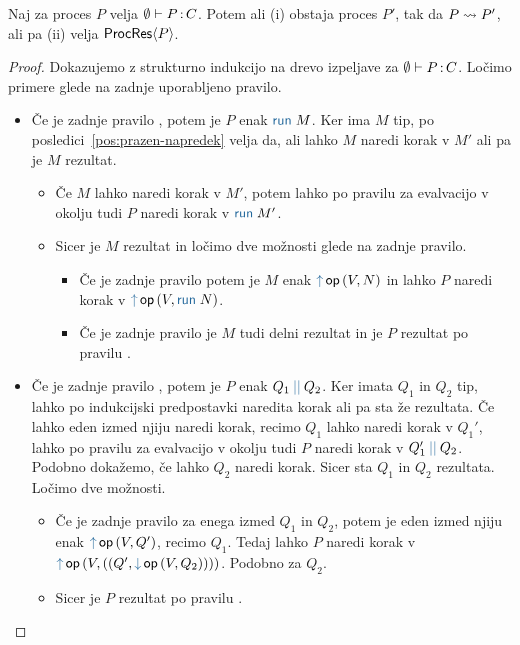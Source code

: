 \begin{izrek}[o napredku]\label{izr:napredek}
	Naj za proces $P$ velja $\emptyset \vdash P \mathinner{:} C$. Potem ali (i) obstaja proces $P'$, tak da $P \leadsto P'$, ali pa (ii) velja $\mathsf{ProcRes}\langle P \rangle$.
\end{izrek}

\begin{proof}
	Dokazujemo z strukturno indukcijo na drevo izpeljave za $\emptyset \vdash P \mathinner{:} C$.
	Ločimo primere glede na zadnje uporabljeno pravilo.
	
	\begin{itemize}
		\item Če je zadnje pravilo , potem je $P$ enak $\tmrun{M}$.
		Ker ima $M$ tip, po posledici~\ref{pos:prazen-napredek} velja da, ali lahko $M$ naredi korak v $M'$ ali pa je $M$ rezultat.
		\begin{itemize}
			\item Če $M$ lahko naredi korak v $M'$, potem lahko po pravilu za evalvacijo v okolju tudi $P$ naredi korak v $\tmrun{M'}$.
			\item Sicer je $M$ rezultat in ločimo dve možnosti glede na zadnje pravilo.
			\begin{itemize}
				\item Če je zadnje pravilo  potem je $M$ enak $\tmopout{op}{V}{N}$ in lahko $P$ naredi korak v $\tmopout{op}{V}{\tmrun{N}}$.
				\item Če je zadnje pravilo  je $M$ tudi delni rezultat in je $P$ rezultat po pravilu .
			\end{itemize}
		\end{itemize}
		
		\item Če je zadnje pravilo , potem je $P$ enak $\tmpar{Q_1}{Q_2}$. Ker imata $Q_1$ in $Q_2$ tip, lahko po indukcijski predpostavki naredita korak ali pa sta že rezultata.
		Če lahko eden izmed njiju naredi korak, recimo $Q_1$ lahko naredi korak v $Q_1'$, lahko po pravilu za evalvacijo v okolju tudi $P$ naredi korak v $\tmpar{Q_1'}{Q_2}$. Podobno dokažemo, če lahko $Q_2$ naredi korak.
		Sicer sta $Q_1$ in $Q_2$ rezultata. Ločimo dve možnosti.
		\begin{itemize}
			\item Če je zadnje pravilo  za enega izmed $Q_1$ in $Q_2$, potem je eden izmed njiju enak $\tmopout{op}{V}{Q'}$, recimo $Q_1$. Tedaj lahko $P$ naredi korak v $\tmopout{op}{V}{(\tmpair{Q'}{\tmopin{op}{V}{Q_2}})}$. Podobno za $Q_2$.
			\item Sicer je $P$ rezultat po pravilu .
		\end{itemize}
		

\end{itemize}
\end{proof}
